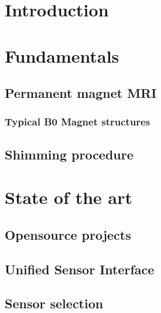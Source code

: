 \hypertarget{introduction}{%
\chapter{Introduction}\label{introduction}}

\hypertarget{fundamentals}{%
\chapter{Fundamentals}\label{fundamentals}}

\hypertarget{permanent-magnet-mri}{%
\section{Permanent magnet MRI}\label{permanent-magnet-mri}}

\hypertarget{typical-b0-magnet-structures}{%
\subsection{Typical B0 Magnet
structures}\label{typical-b0-magnet-structures}}

\hypertarget{shimming-procedure}{%
\section{Shimming procedure}\label{shimming-procedure}}

\hypertarget{state-of-the-art}{%
\chapter{State of the art}\label{state-of-the-art}}

\hypertarget{opensource-projects}{%
\section{Opensource projects}\label{opensource-projects}}

\hypertarget{unified-sensor-interface}{%
\section{Unified Sensor Interface}\label{unified-sensor-interface}}

\hypertarget{sensor-selection}{%
\section{Sensor selection}\label{sensor-selection}}


